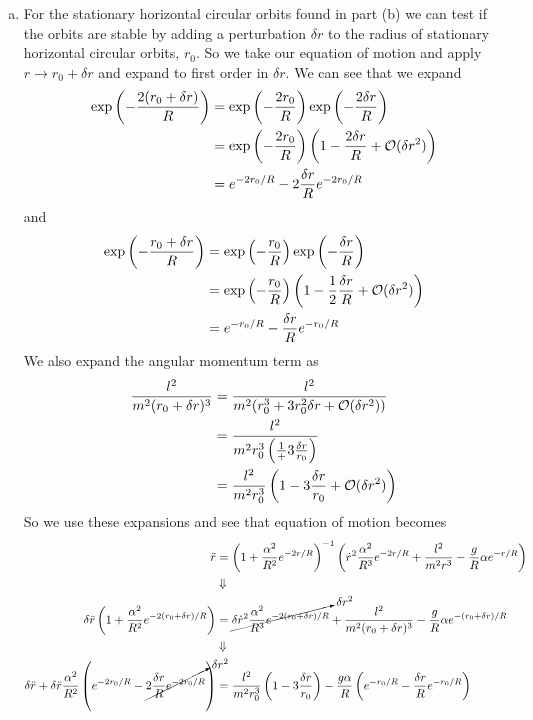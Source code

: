 \documentclass[11pt]{article}
\numberwithin{equation}{section}
\begin{document}
\begin{enumerate}[(a)]
\item For the stationary horizontal circular orbits found in part (b) we can test if the 
orbits are stable by adding a perturbation $\delta r$ to the radius of stationary horizontal
circular orbits, $r_0$. So we take our equation of motion and apply $r\rightarrow r_0+
\delta{r}$ and expand to first order in $\delta{r}$. We can see that we expand
\begin{align*}
\exp\left(-\frac{2(r_0+\delta{r})}{R}\right) &= \exp\left(-\frac{2r_0}{R}\right)\exp\left(-\frac{2\delta{r}}{R}\right)\\
&= \exp\left(-\frac{2r_0}{R}\right)\left(1-\frac{2\delta{r}}{R} + \mathcal{O}(\delta{r}^2)\right)\\
&= e^{-2r_0/R} - 2\frac{\delta{r}}{R} e^{-2r_0/R}
\end{align*}
and
\begin{align*}
\exp\left(-\frac{r_0+\delta{r}}{R}\right) &= \exp\left(-\frac{r_0}{R}\right)\exp\left(-\frac{\delta{r}}{R}\right)\\
&= \exp\left(-\frac{r_0}{R}\right)\left(1-\frac{1}{2}\frac{\delta{r}}{R} + \mathcal{O}(\delta{r}^2)\right)\\
&= e^{-r_0/R} - \frac{\delta{r}}{R} e^{-r_0/R}
\end{align*}
We also expand the angular momentum term as
\begin{align*}
\frac{l^2}{m^2(r_0+\delta{r})^3} &=  \frac{l^2}{m^2(r_0^3+3r_0^2\delta{r}+\mathcal{O}(\delta{r}^2))}\\
&=  \frac{l^2}{m^2r_0^3\left(\frac{1}+3\frac{\delta{r}}{r_0}\right)}\\
&=  \frac{l^2}{m^2r_0^3}\left(1 - 3\frac{\delta{r}}{r_0} + \mathcal{O}(\delta{r}^2)\right)
\end{align*}
So we use these expansions and see that equation of motion becomes
\begin{align*}
\ddot{r} &= \left(1 + \frac{\alpha^2}{R^2}e^{-2r/R}\right)^{-1}\left(\dot{r}^2\frac{\alpha^2}{R^3}e^{-2r/R} + \frac{l^2}{m^2r^3} - \frac{g}{R}\alpha e^{-r/R}\right)\\
&\Downarrow\\
\delta\ddot{r}\left(1 + \frac{\alpha^2}{R^2}e^{-2(r_0+\delta{r})/R}\right) &= \cancelto{\delta{r}^2}{\delta\dot{r}^2\frac{\alpha^2}{R^3}e^{-2(r_0+\delta{r})/R}} + \frac{l^2}{m^2(r_0+\delta{r})^3} - \frac{g}{R}\alpha e^{-(r_0+\delta{r})/R}\\
&\Downarrow\\
\delta\ddot{r} + \delta\ddot{r}\frac{\alpha^2}{R^2}\left(e^{-2r_0/R} - \cancelto{\delta{r}^2}{2\frac{\delta{r}}{R}e^{-2r_0/R}}\right) &= \frac{l^2}{m^2r_0^3}\left(1 -3\frac{\delta{r}}{r_0}\right)  - \frac{g\alpha}{R}\left(e^{-r_0/R}-\frac{\delta{r}}{R}e^{-r_0/R}\right)\\

\end{align*}
\end{enumerate}
\end{document}
